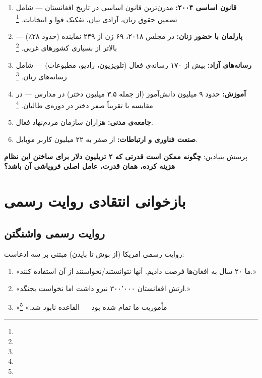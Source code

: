 \begin{tcolorbox}[defbox, title={دستاوردهای بیست‌ساله‌ای که از دست رفت}]
\begin{enumerate}[nosep, label=\textbf{\arabic*.}]
  \item \textbf{قانون اساسی ۲۰۰۴:} مدرن‌ترین قانون اساسی در تاریخ افغانستان — شامل تضمین حقوق زنان، آزادی بیان، تفکیک قوا و انتخابات.%
  \footnote{}
  \item \textbf{پارلمان با حضور زنان:} در مجلس ۲۰۱۸، ۶۹ زن از ۲۴۹ نماینده (حدود ۲۸٪) — بالاتر از بسیاری کشورهای غربی.%
  \footnote{}
  \item \textbf{رسانه‌های آزاد:} بیش از ۱۷۰ رسانه‌ی فعال (تلویزیون، رادیو، مطبوعات) — شامل رسانه‌های زنان.%
  \footnote{}
  \item \textbf{آموزش:} حدود ۹ میلیون دانش‌آموز (از جمله ۳.۵ میلیون دختر) در مدارس — در مقایسه با تقریباً صفر دختر در دوره‌ی طالبان.%
  \footnote{}
  \item \textbf{جامعه‌ی مدنی:} هزاران سازمان مردم‌نهاد فعال.
  \item \textbf{صنعت فناوری و ارتباطات:} از صفر به ۲۲ میلیون کاربر موبایل.
\end{enumerate}
\end{tcolorbox}

پرسش بنیادین: \textbf{چگونه ممکن است قدرتی که ۲ تریلیون دلار برای ساختن این نظام هزینه کرده، همان قدرت، عامل اصلی فروپاشی آن باشد؟}

\section{بازخوانی انتقادی روایت رسمی}
\label{sec:app-afg-narrative}

\subsection{روایت رسمی واشنگتن}
\label{subsec:app-afg-official}

روایت رسمی امریکا (از بوش تا بایدن) مبتنی بر سه ادعاست:

\begin{enumerate}[nosep, label=\textbf{\arabic*.}]
  \item «ما ۲۰ سال به افغان‌ها فرصت دادیم. آنها نتوانستند/نخواستند از آن استفاده کنند.»
  \item «ارتش افغانستان ۳۰۰٬۰۰۰ نیرو داشت اما نخواست بجنگد.»
  \item «مأموریت ما تمام شده بود — القاعده نابود شد.»%
  \footnote{}
\end{enumerate}

